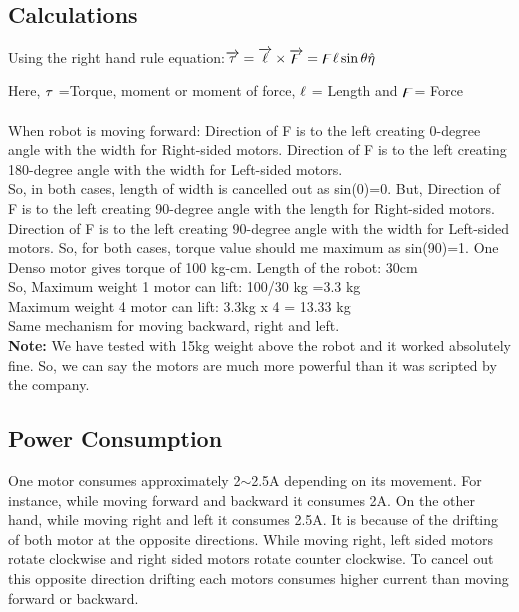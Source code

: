 \documentclass[conference]{IEEEtran}
\begin{document}
	
	\subsection{Calculations}
	
	Using the right hand rule equation:$\overrightarrow{\rm \tau}=\overrightarrow{\rm \ell}\times\overrightarrow{\rm \digamma}=\digamma\ell\sin\theta\hat{\eta}$
	
	Here, $\rm \tau$ =Torque, moment or moment of force, $\rm \ell$ = Length and $\rm \digamma$= Force\\\\
	When robot is moving forward:
	Direction of F is to the left creating 0-degree angle with the width for Right-sided motors.
	Direction of F is to the left creating 180-degree angle with the width for Left-sided motors.\\
	So, in both cases, length of width is cancelled out as sin(0)=0.
	But, Direction of F is to the left creating 90-degree angle with the length for Right-sided motors.
	Direction of F is to the left creating 90-degree angle with the width for Left-sided motors.
	So, for both cases, torque value should me maximum as sin(90)=1. One Denso motor gives torque of 100 kg-cm. Length of the robot: 30cm\\
	
	So, Maximum weight 1 motor can lift: 100/30 kg =3.3 kg
	\\Maximum weight 4 motor can lift: 3.3kg x 4 = 13.33 kg
	\\Same mechanism for moving backward, right and left.\\
	
	\textbf{Note:} We have tested with 15kg weight above the robot and it worked absolutely fine. So, we can say the motors are much more powerful than it was scripted by the company.
	
	
	\subsection{Power Consumption}
	
	One motor consumes approximately 2$\sim$2.5A depending on its movement. For instance, while moving forward and backward it consumes 2A. On the other hand, while moving right and left it consumes 2.5A. It is because of the drifting of both motor at the opposite directions. While moving right, left sided motors rotate clockwise and right sided motors rotate counter clockwise. To cancel out this opposite direction drifting each motors consumes higher current than moving forward or backward.
	
\end{document}
